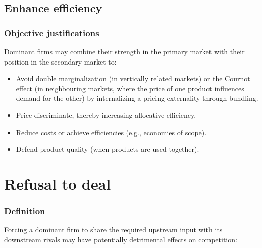     \subsection{Enhance efficiency}
    \subsubsection*{Objective justifications}

        Dominant firms may combine their strength in the primary market with their position in the secondary market to:
        
        \begin{itemize}
            \item Avoid double marginalization (in vertically related markets) or the Cournot effect (in neighbouring markets, where the price of one product influences demand for the other) by internalizing a pricing externality through bundling.
            \item Price discriminate, thereby increasing allocative efficiency.
            \item Reduce costs or achieve efficiencies (e.g., economies of scope).
            \item Defend product quality (when products are used together).
        \end{itemize}


\section{Refusal to deal}

        \subsubsection{Definition}


            Forcing a dominant firm to share the required upstream input with its downstream rivals may have potentially detrimental effects on competition:

